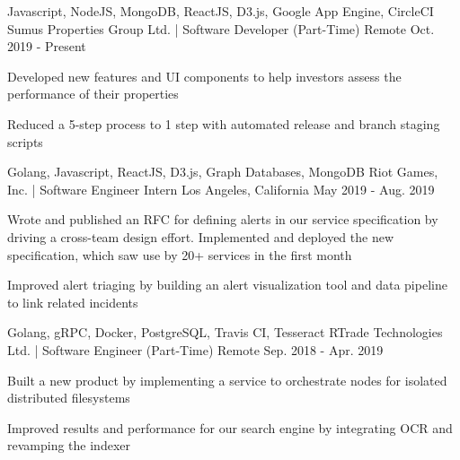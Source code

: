 

\begin{cventries}

  \cventry
    {Javascript, NodeJS, MongoDB, ReactJS, D3.js, Google App Engine, CircleCI} %
    {Sumus Properties Group Ltd. | Software Developer (Part-Time)} %
    {Remote} %
    {Oct. 2019 - Present} %
    {
      \begin{cvitems} %
        \item {Developed new features and UI components to help investors assess the performance of their properties}
        \item {Reduced a 5-step process to 1 step with automated release and branch staging scripts}
      \end{cvitems}
    }

  \cventry
    {Golang, Javascript, ReactJS, D3.js, Graph Databases, MongoDB} %
    {Riot Games, Inc. | Software Engineer Intern} %
    {Los Angeles, California} %
    {May 2019 - Aug. 2019} %
    {
      \begin{cvitems} %
        \item {Wrote and published an RFC for defining alerts in our service specification by driving a cross-team design effort. Implemented and deployed the new specification, which saw use by 20+ services in the first month}
        \item {Improved alert triaging by building an alert visualization tool and data pipeline to link related incidents}
      \end{cvitems}
    }

  \cventry
    {Golang, gRPC, Docker, PostgreSQL, Travis CI, Tesseract} %
    {RTrade Technologies Ltd. | Software Engineer (Part-Time)} %
    {Remote} %
    {Sep. 2018 - Apr. 2019} %
    {
      \begin{cvitems} %
        \item {Built a new product by implementing a service to orchestrate nodes for isolated distributed filesystems}
        \item {Improved results and performance for our search engine by integrating OCR and revamping the indexer}
      \end{cvitems}
    }


\end{cventries}
